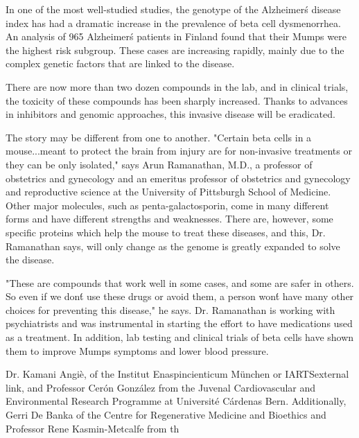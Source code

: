 \documentclass{article}
\begin{document}
In one of the most well-studied studies, the genotype of the Alzheimer\'s disease index has had a dramatic increase in the prevalence of beta cell dysmenorrhea. An analysis of 965 Alzheimer\'s patients in Finland found that their Mumps were the highest risk subgroup. These cases are increasing rapidly, mainly due to the complex genetic factors that are linked to the disease.

There are now more than two dozen compounds in the lab, and in clinical trials, the toxicity of these compounds has been sharply increased. Thanks to advances in inhibitors and genomic approaches, this invasive disease will be eradicated.

The story may be different from one to another. "Certain beta cells in a mouse...meant to protect the brain from injury are for non-invasive treatments or they can be only isolated," says Arun Ramanathan, M.D., a professor of obstetrics and gynecology and an emeritus professor of obstetrics and gynecology and reproductive science at the University of Pittsburgh School of Medicine. Other major molecules, such as penta-galactosporin, come in many different forms and have different strengths and weaknesses. There are, however, some specific proteins which help the mouse to treat these diseases, and this, Dr. Ramanathan says, will only change as the genome is greatly expanded to solve the disease.

"These are compounds that work well in some cases, and some are safer in others. So even if we don\'t use these drugs or avoid them, a person won\'t have many other choices for preventing this disease," he says. Dr. Ramanathan is working with psychiatrists and was instrumental in starting the effort to have medications used as a treatment. In addition, lab testing and clinical trials of beta cells have shown them to improve Mumps symptoms and lower blood pressure.

Dr. Kamani Angiè, of the Institut Enaspincienticum München or IARTSexternal link, and Professor Cerón González from the Juvenal Cardiovascular and Environmental Research Programme at Université Cárdenas Bern. Additionally, Gerri De Banka of the Centre for Regenerative Medicine and Bioethics and Professor Rene Kasmin-Metcalfe from th
\end{document}
